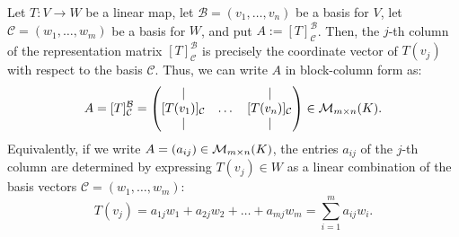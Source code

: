 \begin{proposition*}
\label{prop:columns_of_representation_matrix}
Let $T: V \to W$ be a linear map, let $\mathcal{B} = (v_1, \dots, v_n)$ be a basis for $V$, let $\mathcal{C} = (w_1, \dots, w_m)$ be a basis for $W$, and put $A := [T]_{\mathcal{C}}^{\mathcal{B}}$.
Then, the $j$-th column of the representation matrix $[T]_{\mathcal{C}}^{\mathcal{B}}$ is precisely the coordinate vector of $T(v_j)$ with respect to the basis $\mathcal{C}$. Thus, we can write $A$ in block-column form as:
\[
A = [T]_{\mathcal{C}}^{\mathcal{B}} =
\begin{pmatrix}
| & & | \\
[T(v_1)]_{\mathcal{C}} & \dots & [T(v_n)]_{\mathcal{C}} \\
| & & |
\end{pmatrix}
\in \mathcal{M}_{m \times n}(K).
\]
Equivalently, if we write $A = (a_{ij}) \in \mathcal{M}_{m \times n}(K)$, the entries $a_{ij}$ of the $j$-th column are determined by expressing $T(v_j) \in W$ as a linear combination of the basis vectors $\mathcal{C} = (w_1, \dots, w_m)$:
\[
T(v_j) = a_{1j} w_1 + a_{2j} w_2 + \dots + a_{mj} w_m = \sum_{i=1}^m a_{ij} w_i.
\]
\end{proposition*}

